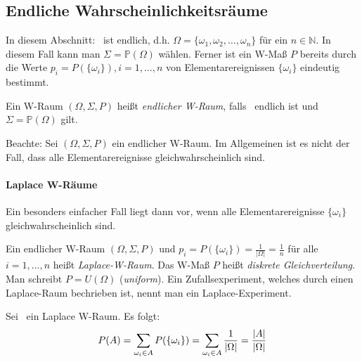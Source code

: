 \subsection{Endliche Wahrscheinlichkeitsräume}
In diesem Abschnitt: \tO\ ist endlich, d.h. $\Omega = \{\omega_1, \omega_2, \dots, \omega_n\}$
für ein $n \in \mathbb{N}$.
In diesem Fall kann man $\Sigma = \mathbb{P}(\Omega)$ wählen.
Ferner ist ein W-Maß $P$ bereits durch die Werte $p_i = P(\{\omega_i\}), i=1,\dots,n$
von Elementarereignissen $\{\omega_i\}$ eindeutig bestimmt.

\begin{definition}
    Ein W-Raum $(\Omega, \Sigma,  P)$ heißt \emph{endlicher W-Raum}, falls \tO\ endlich ist und
    $\Sigma = \mathbb{P}(\Omega)$ gilt.
\end{definition}

Beachte: Sei $(\Omega, \Sigma, P)$ ein endlicher W-Raum. Im Allgemeinen ist es nicht der Fall, dass alle
Elementarereignisse gleichwahrscheinlich sind.

\paragraph{Laplace W-Räume} Ein besonders einfacher Fall liegt dann vor, wenn alle Elementarereignisse
$\{\omega_i\}$ gleichwahrscheinlich sind.

\begin{definition}
    Ein endlicher W-Raum $(\Omega, \Sigma, P)$ und $p_i = P(\{\omega_i\}) = \frac{1}{|\Omega|} = \frac{1}{n}$
    für alle $i=1,\dots,n$ heißt \emph{Laplace-W-Raum}.
    Das W-Maß $P$ heißt \emph{diskrete Gleichverteilung}.
    Man schreibt $P=U(\Omega)$ (\textit{uniform}).
    Ein Zufallsexperiment, welches durch einen Laplace-Raum bechrieben ist, nennt man ein
    Laplace-Experiment.
\end{definition}

Sei \wraum\ ein Laplace W-Raum. Es folgt:
\begin{equation*}
    P(A) = \sum_{\omega_i \in A} P(\{\omega_i\}) = \sum_{\omega_i \in A} \frac{1}{|\Omega|} = \frac{|A|}{|\Omega|}
\end{equation*}

